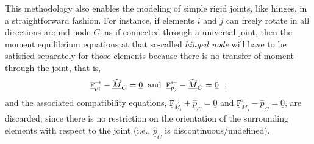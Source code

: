 \documentclass[12pt,a4paper,oneside,english]{abntex2} %
\newcommand{\vect}[1]{\underline{#1}}
\def\p{\vect{p}}
\def\phat{\widehat{\p}}
\def\M{\vect{M}}
\def\Mhat{\widehat{\M}}
\def\zv{\vect{0}}
\def\Fppi{\mathtt{\vect{F}}_{p_i}^\rightarrow}
\def\Fpmj{\mathtt{\vect{F}}_{p_j}^\leftarrow}
\def\FMpi{\mathtt{\vect{F}}_{M_i}^\rightarrow}
\def\FMmj{\mathtt{\vect{F}}_{M_j}^\leftarrow}
\begin{document}
This methodology also enables the modeling of simple rigid joints, like hinges, in a straightforward fashion. For instance, if elements $i$ and $j$ can freely rotate in all directions around node $C$, as if connected through a universal joint, then the moment equilibrium equations at that so-called \textit{hinged node} will have to be satisfied separately for those elements because there is no transfer of moment through the joint, that is,
\begin{align}
    \Fppi - \Mhat_C = \zv \;\; \textnormal{and} \;\; \Fpmj - \Mhat_C = \zv \ \ ,
    \label{eq:F_hinge}
\end{align}
and the associated compatibility equations, $\FMpi + \phat_C = \zv$ and $\FMmj - \phat_C = \zv$, are discarded, since there is no restriction on the orientation of the surrounding elements with respect to the joint (i.e., $\phat_C$ is discontinuous/undefined).
\end{document}
